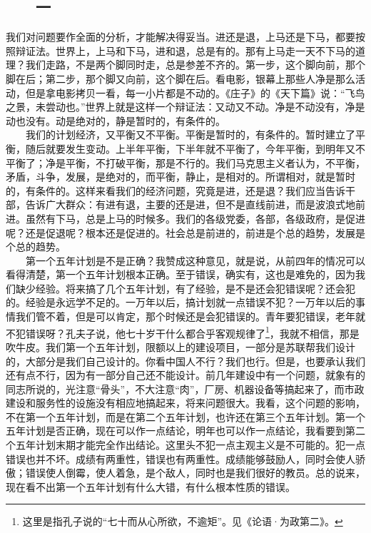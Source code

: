 \documentclass[cn,11pt,chinese]{elegantbook}
\def\myformat#1{\hfil\hfil #1}
\begin{document}
\subsection*{\myformat{　　一}}
我们对问题要作全面的分析，才能解决得妥当。进还是退，上马还是下马，都要按照辩证法。世界上，上马和下马，进和退，总是有的。那有上马走一天不下马的道理？我们走路，不是两个脚同时走，总是参差不齐的。第一步，这个脚向前，那个脚在后；第二步，那个脚又向前，这个脚在后。看电影，银幕上那些人净是那么活动，但是拿电影拷贝一看，每一小片都是不动的。《庄子》的《天下篇》说：“飞鸟之景，未尝动也。”世界上就是这样一个辩证法：又动又不动。净是不动没有，净是动也没有。动是绝对的，静是暂时的，有条件的。\\
　　我们的计划经济，又平衡又不平衡。平衡是暂时的，有条件的。暂时建立了平衡，随后就要发生变动。上半年平衡，下半年就不平衡了，今年平衡，到明年又不平衡了；净是平衡，不打破平衡，那是不行的。我们马克思主义者认为，不平衡，矛盾，斗争，发展，是绝对的，而平衡，静止，是相对的。所谓相对，就是暂时的，有条件的。这样来看我们的经济问题，究竟是进，还是退？我们应当告诉干部，告诉广大群众：有进有退，主要的还是进，但不是直线前进，而是波浪式地前进。虽然有下马，总是上马的时候多。我们的各级党委，各部，各级政府，是促进呢？还是促退呢？根本还是促进的。社会总是前进的，前进是个总的趋势，发展是个总的趋势。\\
　　第一个五年计划是不是正确？我赞成这种意见，就是说，从前四年的情况可以看得清楚，第一个五年计划根本正确。至于错误，确实有，这也是难免的，因为我们缺少经验。将来搞了几个五年计划，有了经验，是不是还会犯错误呢？还会犯的。经验是永远学不足的。一万年以后，搞计划就一点错误不犯？一万年以后的事情我们管不着，但是可以肯定，那个时候还是会犯错误的。青年要犯错误，老年就不犯错误呀？孔夫子说，他七十岁干什么都合乎客观规律了\footnote[1]{ 这里是指孔子说的“七十而从心所欲，不逾矩”。见《论语·为政第二》。}，我就不相信，那是吹牛皮。我们第一个五年计划，限额以上的建设项目，一部分是苏联帮我们设计的，大部分是我们自己设计的。你看中国人不行？我们也行。但是，也要承认我们还有点不行，因为有一部分自己还不能设计。前几年建设中有一个问题，就象有的同志所说的，光注意“骨头”，不大注意“肉”，厂房、机器设备等搞起来了，而市政建设和服务性的设施没有相应地搞起来，将来问题很大。我看，这个问题的影响，不在第一个五年计划，而是在第二个五年计划，也许还在第三个五年计划。第一个五年计划是否正确，现在可以作一点结论，明年也可以作一点结论，我看要到第二个五年计划末期才能完全作出结论。这里头不犯一点主观主义是不可能的。犯一点错误也并不坏。成绩有两重性，错误也有两重性。成绩能够鼓励人，同时会使人骄傲；错误使人倒霉，使人着急，是个敌人，同时也是我们很好的教员。总的说来，现在看不出第一个五年计划有什么大错，有什么根本性质的错误。\\
\end{document}
